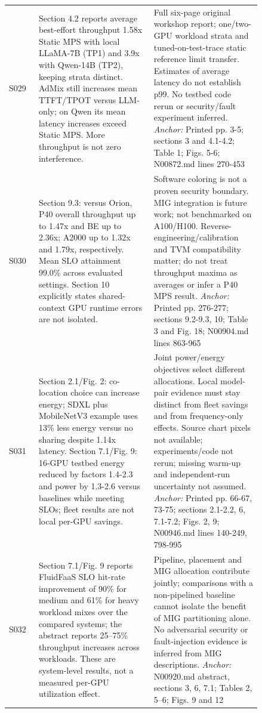 \begin{longtable}{P{0.105\linewidth}P{0.39\linewidth}P{0.35\linewidth}}
S029 \cite{admix} & Section 4.2 reports average best-effort throughput 1.58x Static MPS with local LLaMA-7B (TP1) and 3.9x with Qwen-14B (TP2), keeping strata distinct. AdMix still increases mean TTFT/TPOT versus LLM-only; on Qwen its mean latency increases exceed Static MPS. More throughput is not zero interference. & Full six-page original workshop report; one/two-GPU workload strata and tuned-on-test-trace static reference limit transfer. Estimates of average latency do not establish p99. No testbed code rerun or security/fault experiment inferred. \emph{Anchor:} Printed pp. 3-5; sections 3 and 4.1-4.2; Table 1; Figs. 5-6; N00872.md lines 270-453 \\
S030 \cite{sgdrc} & Section 9.3: versus Orion, P40 overall throughput up to 1.47x and BE up to 2.36x; A2000 up to 1.32x and 1.79x, respectively. Mean SLO attainment 99.0\% across evaluated settings. Section 10 explicitly states shared-context GPU runtime errors are not isolated. & Software coloring is not a proven security boundary. MIG integration is future work; not benchmarked on A100/H100. Reverse-engineering/calibration and TVM compatibility matter; do not treat throughput maxima as averages or infer a P40 MPS result. \emph{Anchor:} Printed pp. 276-277; sections 9.2-9.3, 10; Table 3 and Fig. 18; N00904.md lines 863-965 \\
S031 \cite{enertune} & Section 2.1/Fig. 2: co-location choice can increase energy; SDXL plus MobileNetV3 example uses 13\% less energy versus no sharing despite 1.14x latency. Section 7.1/Fig. 9: 16-GPU testbed energy reduced by factors 1.4-2.3 and power by 1.3-2.6 versus baselines while meeting SLOs; fleet results are not local per-GPU savings. & Joint power/energy objectives select different allocations. Local model-pair evidence must stay distinct from fleet savings and from frequency-only effects. Source chart pixels not available; experiments/code not rerun; missing warm-up and independent-run uncertainty not assumed. \emph{Anchor:} Printed pp. 66-67, 73-75; sections 2.1-2.2, 6, 7.1-7.2; Figs. 2, 9; N00946.md lines 140-249, 798-995 \\
S032 \cite{fluidfaas} & Section 7.1/Fig. 9 reports FluidFaaS SLO hit-rate improvement of 90\% for medium and 61\% for heavy workload mixes over the compared systems; the abstract reports 25--75\% throughput increases across workloads. These are system-level results, not a measured per-GPU utilization effect. & Pipeline, placement and MIG allocation contribute jointly; comparisons with a non-pipelined baseline cannot isolate the benefit of MIG partitioning alone. No adversarial security or fault-injection evidence is inferred from MIG descriptions. \emph{Anchor:} N00920.md abstract, sections 3, 6, 7.1; Tables 2, 5--6; Figs. 9 and 12 \\

\end{longtable}
